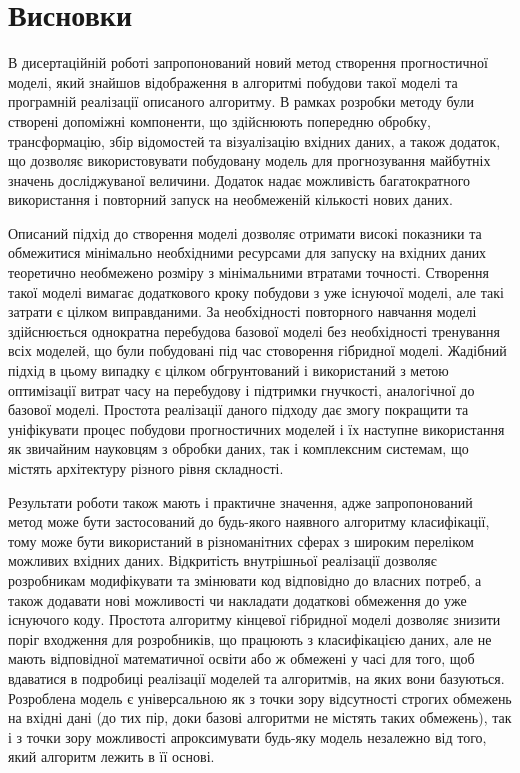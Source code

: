 \section{Висновки}

В дисертаційній роботі запропонований новий метод створення прогностичної моделі, який знайшов відображення в алгоритмі побудови такої моделі та програмній реалізації описаного алгоритму. В рамках розробки методу були створені допоміжні компоненти, що здійснюють попередню обробку, трансформацію, збір відомостей та візуалізацію вхідних даних, а також додаток, що дозволяє використовувати побудовану модель для прогнозування майбутніх значень досліджуваної величини. Додаток надає можливість багатократного використання і повторний запуск на необмеженій кількості нових даних.

Описаний підхід до створення моделі дозволяє отримати високі показники та обмежитися мінімально необхідними ресурсами для запуску на вхідних даних теоретично необмежено розміру з мінімальними втратами точності. Створення такої моделі вимагає додаткового кроку побудови з уже існуючої моделі, але такі затрати є цілком виправданими. За необхідності повторного навчання моделі здійснюється однократна перебудова базової моделі без необхідності тренування всіх моделей, що були побудовані під час стоворення гібридної моделі. Жадібний підхід в цьому випадку є цілком обгрунтований і використаний з метою оптимізації витрат часу на перебудову і підтримки гнучкості, аналогічної до базової моделі. Простота реалізації даного підходу дає змогу покращити та уніфікувати процес побудови прогностичних моделей і їх наступне використання як звичайним науковцям з обробки даних, так і комплексним системам, що містять архітектуру різного рівня складності.

Результати роботи також мають і практичне значення, адже запропонований метод може бути застосований до будь-якого наявного алгоритму класифікації, тому може бути використаний в різноманітних сферах з широким переліком можливих вхідних даних.
Відкритість внутрішньої реалізації дозволяє розробникам модифікувати та змінювати код відповідно до власних потреб, а також додавати нові можливості чи накладати додаткові обмеження до уже існуючого коду. Простота алгоритму кінцевої гібридної моделі дозволяє знизити поріг входження для розробників, що працюють з класифікацією даних, але не мають відповідної математичної освіти або ж обмежені у часі для того, щоб вдаватися в подробиці реалізації моделей та алгоритмів, на яких вони базуються. Розроблена модель є універсальною як з точки зору відсутності строгих обмежень на вхідні дані (до тих пір, доки базові алгоритми не містять таких обмежень), так і з точки зору можливості апроксимувати будь-яку модель незалежно від того, який алгоритм лежить в її основі. 

